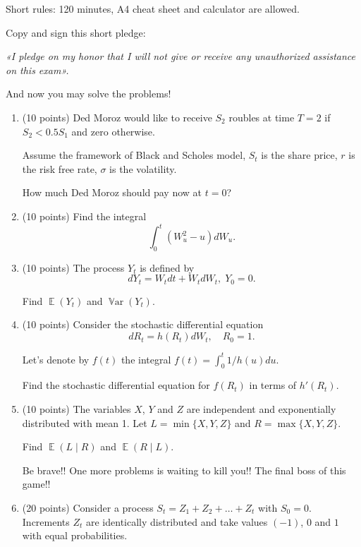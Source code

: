 \documentclass[12pt]{article}
\DeclareMathOperator{\E}{\mathbb{E}}
\DeclareMathOperator{\Var}{\mathbb{V}ar}
\begin{document}
Short rules: 120 minutes, A4 cheat sheet and calculator are allowed.


Copy and sign this short pledge:

\vspace{10pt}
\textit{«I pledge on my honor that I will not give or receive any unauthorized 
assistance on this exam».}
\vspace{10pt}


And now you may solve the problems!


\begin{enumerate}

    \item (10 points) Ded Moroz would like to receive $S_2$ roubles at time $T=2$ if $S_2< 0.5S_1$ and zero otherwise.
    
    Assume the framework of Black and Scholes model, $S_t$ is the share price, $r$ is the risk free rate,
    $\sigma$ is the volatility. 

    How much Ded Moroz should pay now at $t=0$?
    
    \item (10 points) Find the integral
    \[
    \int_0^t (W_u^2 - u) dW_u.    
    \]

    \item (10 points) The process $Y_t$ is defined by 
    \[
    dY_t = W_t dt  + W_t dW_t, \; Y_0 = 0.    
    \]
    
    Find $\E(Y_t)$ and $\Var(Y_t)$.

    \item (10 points) Consider the stochastic differential equation
    \[
    dR_t = h(R_t) dW_t, \quad R_0 = 1.
    \]

    Let's denote by $f(t)$ the integral $f(t)= \int_0^t 1/h(u) du$. 

    Find the stochastic differential equation for $f(R_t)$ in terms of $h'(R_t)$.

    \item (10 points) The variables $X$, $Y$ and $Z$ are independent and exponentially distributed with mean 1.
    Let $L = \min \{X, Y, Z\}$ and $R = \max \{X, Y, Z\}$. 

    Find $\E(L \mid R)$ and $\E(R\mid L)$.

    \vspace{20pt}

    Be brave!! One more problems is waiting to kill you!! The final boss of this game!!

    \newpage


    \item (20 points) Consider a process $S_t = Z_1 + Z_2 + \ldots + Z_t$ with $S_0=0$.
    Increments $Z_t$ are identically distributed and take values $(-1)$, $0$ and $1$ 
    with equal probabilities. 


\end{enumerate}
\end{document}
